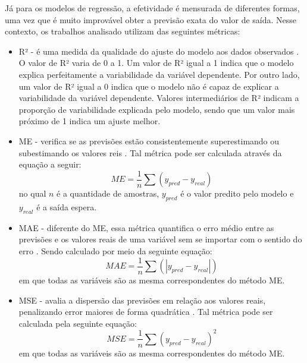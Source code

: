 Já para os modelos de regressão, a efetividade é mensurada de diferentes formas, uma vez que é muito improvável obter a previsão exata do valor de saída. Nesse contexto, os trabalhos analisado utilizam das seguintes métricas: 
\begin{itemize}
    \item \ac{R²} - é uma medida da qualidade do ajuste do modelo aos dados observados \cite{Charlene, Jian_Forecasting}. O valor de R² varia de 0 a 1. Um valor de R² igual a 1 indica que o modelo explica perfeitamente a variabilidade da variável dependente. Por outro lado, um valor de R² igual a 0 indica que o modelo não é capaz de explicar a variabilidade da variável dependente. Valores intermediários de R² indicam a proporção de variabilidade explicada pelo modelo, sendo que um valor mais próximo de 1 indica um ajuste melhor.
    
    \item \ac{ME} - verifica se as previsões estão consistentemente superestimando ou subestimando os valores reis \cite{Leonardo_Comparative}. Tal métrica pode ser calculada através da equação a seguir: 
    \begin{equation}
        \label{eq:ME}
        ME = \frac{1}{n} \sum(y_{pred} - y_{real})
    \end{equation}
    no qual $n$ é a quantidade de amostras, $y_{pred}$ é o valor predito pelo modelo e $y_{real}$ é a saída espera.
    
    \item \ac{MAE} - diferente do \ac{ME}, essa métrica quantifica o erro médio entre as previsões e os valores reais de uma variável sem se importar com o sentido do erro \cite{Amin_Aminimehr_Comprehensive, Manrui_two-stage}. Sendo calculado por meio da seguinte equação:
    \begin{equation}
        \label{eq:MAE}
        MAE = \frac{1}{n} \sum(|y_{pred} - y_{real}|)
    \end{equation}
    em que todas as variáveis são as mesma correspondentes do método \ac{ME}.
    
    \item \ac{MSE} - avalia a dispersão das previsões em relação aos valores reais, penalizando error maiores de forma quadrática \cite{Jian_Forecasting, Chaojie_Stock}. Tal métrica pode ser calculada pela seguinte equação:
    \begin{equation}
        \label{eq:MSE}
        MSE = \frac{1}{n} \sum(y_{pred} - y_{real})^2
    \end{equation}
    em que todas as variáveis são as mesma correspondentes do método \ac{ME}.
    

\end{itemize}
